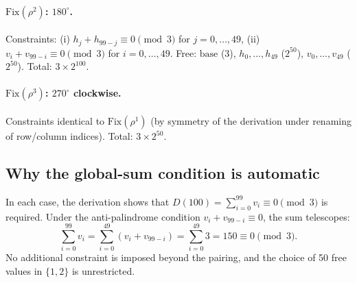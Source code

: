 \documentclass{article}
\newcommand{\Fix}{\mathrm{Fix}}
\begin{document}
\paragraph{$\Fix(\rho^2)$: $180^\circ$.}
Constraints:
(i) $h_j + h_{99-j} \equiv 0\pmod3$ for $j=0,\ldots,49$,
(ii) $v_i + v_{99-i} \equiv 0\pmod3$ for $i=0,\ldots,49$.
Free: $\mathrm{base}$ (3), $h_0,\ldots,h_{49}$ ($2^{50}$),
  $v_0,\ldots,v_{49}$ ($2^{50}$).
Total: $3\times 2^{100}$.

\paragraph{$\Fix(\rho^3)$: $270^\circ$ clockwise.}
Constraints identical to $\Fix(\rho^1)$ (by symmetry of the
derivation under renaming of row/column indices).
Total: $3\times 2^{50}$.

\subsection{Why the global-sum condition is automatic}

In each case, the derivation shows that
$D(100) = \sum_{i=0}^{99}v_i\equiv 0\pmod3$ is required.
Under the anti-palindrome condition $v_i + v_{99-i}\equiv 0$,
the sum telescopes:
\[
  \sum_{i=0}^{99}v_i
  = \sum_{i=0}^{49}(v_i+v_{99-i})
  = \sum_{i=0}^{49}3
  = 150 \equiv 0\pmod3.
\]
No additional constraint is imposed beyond the pairing, and
the choice of 50 free values in $\{1,2\}$ is unrestricted.
\end{document}
